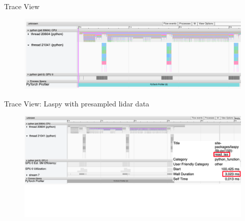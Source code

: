 \documentclass[compress,aspectratio=169]{beamer}
\begin{document}
\begin{frame}{Trace View}
    \vspace{-1em}
\begin{center}
    \begin{figure}
        \includegraphics[width=1\textwidth]{./assets/scap_gtx1080_profiler-torch_batch-size-64_14650758_trace-view}
    \end{figure}
    \end{center}
\end{frame}

\begin{frame}{Trace View: Laspy with presampled lidar data}
    \vspace{-1em}
\begin{center}
    \begin{figure}
        \includegraphics[width=1\textwidth]{./assets/scap_gtx1080_profiler-torch_batch-size-64_14650758_trace-view-laspy}
    \end{figure}
    \end{center}
\end{frame}
\end{document}
